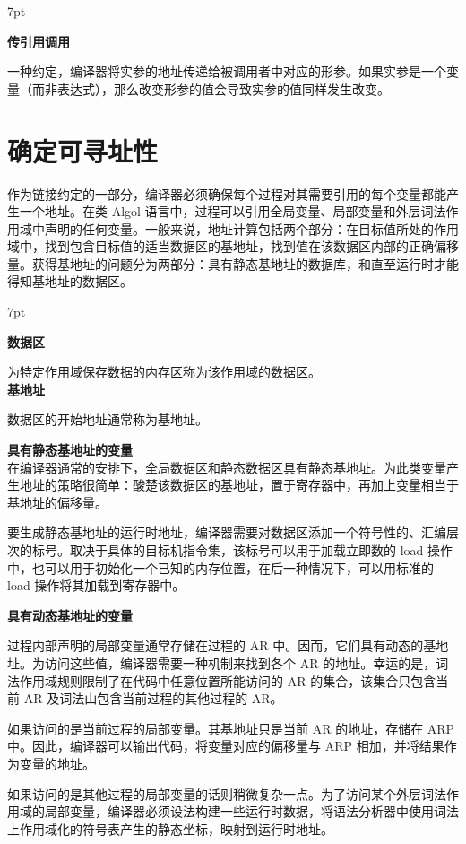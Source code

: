 \documentclass[12pt]{article}
\newenvironment{formal}{%
\def\FrameCommand{%
\hspace{1pt}%
{\color{DarkBlue}\vrule width 2pt}%
{\color{formalshade}\vrule width 4pt}%
\colorbox{formalshade}%
}%
\MakeFramed{\advance\hsize-\width\FrameRestore}%
\noindent\hspace{-4.55pt}%
\begin{adjustwidth}{}{7pt}%
\vspace{2pt}\vspace{2pt}%
}
{%
\vspace{2pt}\end{adjustwidth}\endMakeFramed%
}
\begin{document}
\begin{formal}
\textbf{传引用调用} \par
一种约定，编译器将实参的地址传递给被调用者中对应的形参。如果实参是一个变量（而非表达式），那么改变形参的值会导致实参的值同样发生改变。
\end{formal}

\section*{确定可寻址性}
作为链接约定的一部分，编译器必须确保每个过程对其需要引用的每个变量都能产生一个地址。在类 Algol 语言中，过程可以引用全局变量、局部变量和外层词法作用域中声明的任何变量。一般来说，地址计算包括两个部分：在目标值所处的作用域中，找到包含目标值的适当数据区的基地址，找到值在该数据区内部的正确偏移量。获得基地址的问题分为两部分：具有静态基地址的数据库，和直至运行时才能得知基地址的数据区。

\begin{formal}
\textbf{数据区} \par
为特定作用域保存数据的内存区称为该作用域的数据区。
\\
\textbf{基地址} \par
数据区的开始地址通常称为基地址。
\end{formal}

\textbf{具有静态基地址的变量} \\
在编译器通常的安排下，全局数据区和静态数据区具有静态基地址。为此类变量产生地址的策略很简单：酸楚该数据区的基地址，置于寄存器中，再加上变量相当于基地址的偏移量。

要生成静态基地址的运行时地址，编译器需要对数据区添加一个符号性的、汇编层次的标号。取决于具体的目标机指令集，该标号可以用于加载立即数的 load 操作中，也可以用于初始化一个已知的内存位置，在后一种情况下，可以用标准的 load 操作将其加载到寄存器中。

\textbf{具有动态基地址的变量}

过程内部声明的局部变量通常存储在过程的 AR 中。因而，它们具有动态的基地址。为访问这些值，编译器需要一种机制来找到各个 AR 的地址。幸运的是，词法作用域规则限制了在代码中任意位置所能访问的 AR 的集合，该集合只包含当前 AR 及词法山包含当前过程的其他过程的 AR。

如果访问的是当前过程的局部变量。其基地址只是当前 AR 的地址，存储在 ARP 中。因此，编译器可以输出代码，将变量对应的偏移量与 ARP 相加，并将结果作为变量的地址。

如果访问的是其他过程的局部变量的话则稍微复杂一点。为了访问某个外层词法作用域的局部变量，编译器必须设法构建一些运行时数据，将语法分析器中使用词法上作用域化的符号表产生的静态坐标，映射到运行时地址。
\end{document}
